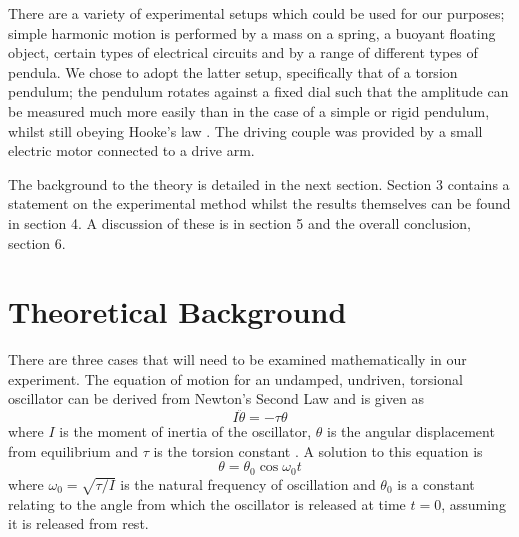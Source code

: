 \documentclass[12pt]{article}
\begin{document}
There are a variety of experimental setups which could be used for our purposes; simple harmonic motion is performed by a mass on a spring, a buoyant floating object, certain types of electrical circuits and by a range of different types of pendula. We chose to adopt the latter setup, specifically that of a torsion pendulum; the pendulum rotates against a fixed dial such that the amplitude can be measured much more easily than in the case of a simple or rigid pendulum, whilst still obeying Hooke's law \cite{torsion}. The driving couple was provided by a small electric motor connected to a drive arm.

The background to the theory is detailed in the next section. Section 3 contains a statement on the experimental method whilst the results themselves can be found in section 4. A discussion of these is in section 5 and the overall conclusion, section 6.

\section{Theoretical Background}
There are three cases that will need to be examined mathematically in our experiment. The equation of motion for an undamped, undriven, torsional oscillator can be derived from Newton's Second Law and is given as
\begin{equation}
I\ddot{\theta}=-\tau\theta
\end{equation}
where $I$ is the moment of inertia of the oscillator, $\theta$ is the angular displacement from equilibrium and $\tau$ is the torsion constant \cite{labmanual}. A solution to this equation is
\begin{equation}
\theta=\theta_0\cos{\omega_0t}
\end{equation}
where $\omega_0=\sqrt{\tau/I}$ is the natural frequency of oscillation and $\theta_0$ is a constant relating to the angle from which the oscillator is released at time $t=0$, assuming it is released from rest.
\end{document}
